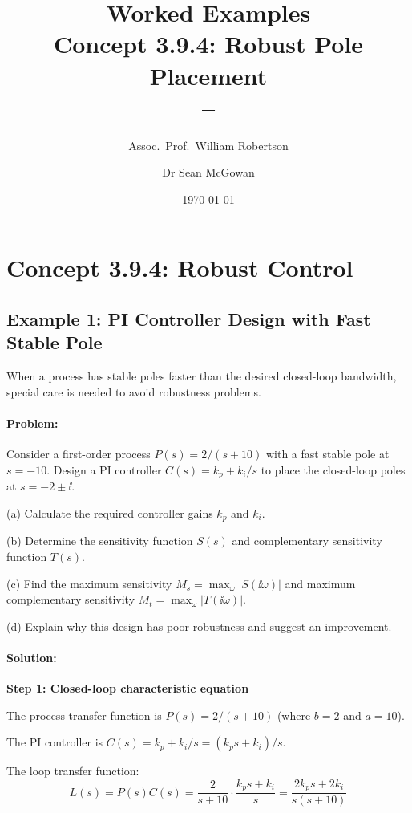 \documentclass[11pt,a4paper]{article}
\title{\textbf{Worked Examples}\\[0.5em]
\large Concept 3.9.4: Robust Pole Placement\\[0.3em]
\normalsize \coursesubtitle{} -- \coursetitle}
\author{Assoc.\ Prof.\ William Robertson \and Dr Sean McGowan}
\date{\today}
\begin{document}
\maketitle
\tableofcontents
\newpage

\section{Concept 3.9.4: Robust Control}

\subsection{Example 1: PI Controller Design with Fast Stable Pole}

When a process has stable poles faster than the desired closed-loop bandwidth, special care is needed to avoid robustness problems.

\paragraph{Problem:}
Consider a first-order process $P(s) = 2/(s+10)$ with a fast stable pole at $s = -10$. Design a PI controller $C(s) = k_p + k_i/s$ to place the closed-loop poles at $s = -2 \pm \ii$.

(a) Calculate the required controller gains $k_p$ and $k_i$.

(b) Determine the sensitivity function $S(s)$ and complementary sensitivity function $T(s)$.

(c) Find the maximum sensitivity $M_s = \max_\omega |S(\ii\omega)|$ and maximum complementary sensitivity $M_t = \max_\omega |T(\ii\omega)|$.

(d) Explain why this design has poor robustness and suggest an improvement.

\paragraph{Solution:}

\textbf{Step 1: Closed-loop characteristic equation}

The process transfer function is $P(s) = 2/(s+10)$ (where $b = 2$ and $a = 10$).

The PI controller is $C(s) = k_p + k_i/s = (k_ps + k_i)/s$.

The loop transfer function:
\begin{equation}
  L(s) = P(s)C(s) = \frac{2}{s+10} \cdot \frac{k_ps + k_i}{s} = \frac{2k_ps + 2k_i}{s(s+10)}
\end{equation}
\end{document}
